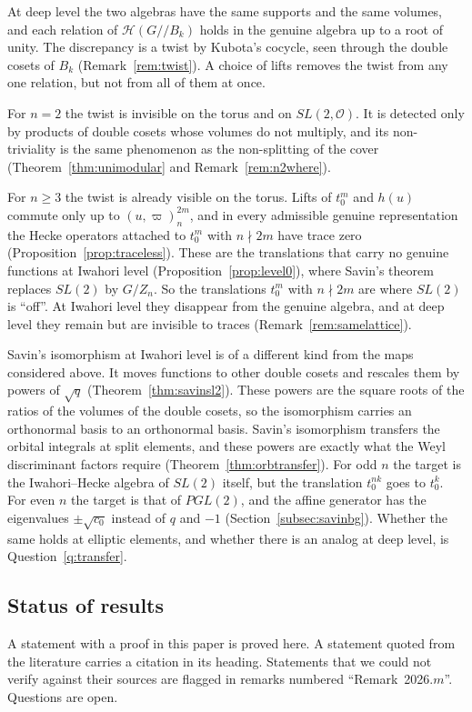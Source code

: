 \documentclass[12pt,letterpaper]{amsart}
\numberwithin{equation}{section}
\theoremstyle{definition}
\theoremstyle{remark}
\newcommand{\cO}{\mathcal{O}}
\newcommand{\cH}{\mathcal{H}}
\newcommand{\Hlin}{\cH(G/\!/B_k)}
\begin{document}
At deep level the two algebras have the same supports and the same
volumes, and each relation of $\Hlin$ holds in the genuine algebra up to
a root of unity. The discrepancy is a twist by Kubota's cocycle, seen
through the double cosets of $B_k$ (Remark~\ref{rem:twist}). A choice of
lifts removes the twist from any one relation, but not from all of them
at once.

For $n=2$ the twist is invisible on the torus and on $SL(2,\cO)$. It is
detected only by products of double cosets whose volumes do not
multiply, and its non-triviality is the same phenomenon as the
non-splitting of the cover (Theorem~\ref{thm:unimodular} and
Remark~\ref{rem:n2where}).

For $n\geq 3$ the twist is already visible on the torus. Lifts of
$t_0^m$ and $h(u)$ commute only up to $(u,\varpi)_n^{2m}$, and in every
admissible genuine representation the Hecke operators attached to
$t_0^m$ with $n\nmid 2m$ have trace zero
(Proposition~\ref{prop:traceless}). These are the translations that
carry no genuine functions at Iwahori level
(Proposition~\ref{prop:level0}), where Savin's theorem replaces $SL(2)$
by $G/Z_n$. So the translations $t_0^m$ with $n\nmid 2m$ are where
$SL(2)$ is ``off''. At Iwahori level they disappear from the genuine
algebra, and at deep level they remain but are invisible to traces
(Remark~\ref{rem:samelattice}).

Savin's isomorphism at Iwahori level is of a different kind from the
maps considered above. It moves functions to other double cosets and
rescales them by powers of $\sqrt q$ (Theorem~\ref{thm:savinsl2}).
These powers are the square roots of the ratios of the volumes of the
double cosets, so the isomorphism carries an orthonormal basis to an
orthonormal basis. Savin's isomorphism transfers the orbital integrals
at split elements, and these powers are exactly what the Weyl
discriminant factors require (Theorem~\ref{thm:orbtransfer}). For odd $n$ the target is the
Iwahori--Hecke algebra of $SL(2)$ itself, but the translation $t_0^{nk}$
goes to $t_0^k$. For even $n$ the target is that of $PGL(2)$, and the
affine generator has the eigenvalues $\pm\sqrt{c_0}$ instead of $q$
and $-1$ (Section~\ref{subsec:savinbg}). Whether the
same holds at elliptic elements, and whether there is an analog at
deep level, is Question~\ref{q:transfer}.

\subsection{Status of results}
\label{subsec:status}
A statement with a proof in this paper is proved here. A statement
quoted from the literature carries a citation in its heading.
Statements that we could not verify against their sources are flagged
in remarks numbered ``Remark~2026.$m$''. Questions are open.
\end{document}

